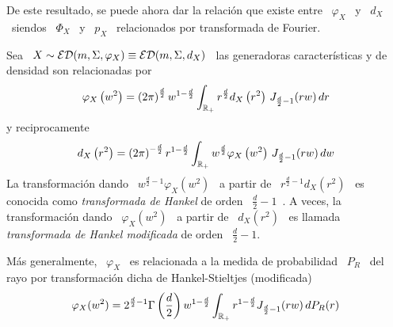 De  este  resultado,  se puede  ahora  dar  la  relaci\'on  que existe  entre  \
$\varphi_X$ \  y \ $d_X$  \ siendos \  $\Phi_X$ \ y  \ $p_X$ \  relacionados por
transformada de Fourier.
%
\begin{teorema}\label{Teo:MP:TransformadaDeHankel}
%
  Sea  \  $X  \sim   \mathcal{ED}(m,\Sigma,\varphi_X)  \equiv  \mathcal{ED}(m,\Sigma,d_X)$  \  las
  generadoras caracter\'isticas y de densidad son relacionadas por
  \[
  \varphi_X\left(   w^2   \right)   =   \left(   2   \pi   \right)^{\frac{d}{2}}
  w^{1-\frac{d}{2}}  \int_{\mathbb{R}_+}  r^{\frac{d}{2}}  d_X\left( r^2  \right)  \,
  J_{\frac{d}{2}-1}( r w) \, dr
  \]
  y reciprocamente
  \[
  d_X\left( r^2 \right) =  \left( 2 \pi \right)^{-\frac{d}{2}} r^{1-\frac{d}{2}}
  \int_{\mathbb{R}_+}     w^{\frac{d}{2}}    \varphi_X\left(    w^2     \right)    \,
  J_{\frac{d}{2}-1}( r w) \, dw
  \]
  La transformaci\'on dando \  $w^{\frac{d}{2}-1} \varphi_X\left( w^2 \right)$ \
  a partir  de \  $r^{\frac{d}{2}-1} d_X\left( r^2  \right)$ \ es  conocida como
  {\em transformada  de Hankel}  de orden \  $\frac{d}{2}-1$~\cite{Sch38, Sch69,
    Sch71,  Lor54,  Pou99,  Pou10}.    A  veces,  la  transformaci\'on  dando  \
  $\varphi_X\left( w^2  \right)$ \ a  partir de \  $d_X\left( r^2 \right)$  \ es
  llamada {\em transformada de Hankel modificada} de orden \ $\frac{d}{2}-1$.

  M\'as generalmente, \ $\varphi_X$ \ es relacionada a la medida de probabilidad
  \   $P_R$  \  del   rayo  por   transformaci\'on  dicha   de  Hankel-Stieltjes
  (modificada)~\cite{Sch38, Nus73, ChoHai70, Sch71}
  \[
  \varphi_X(w^2)   =    2^{\frac{d}{2}-1}   \Gamma\left(   \frac{d}{2}   \right)
  w^{1-\frac{d}{2}}  \int_{\mathbb{R}_+} r^{1-\frac{d}{2}} J_{\frac{d}{2}-1}(r  w) \,
  dP_R(r)
  \]
\end{teorema}
%
